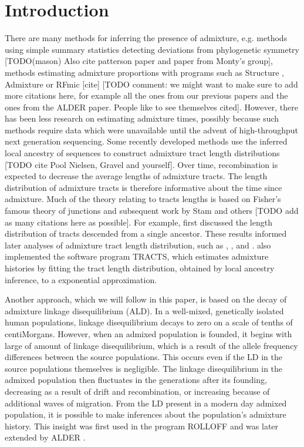 \section*{Introduction}
There are many methods for inferring the presence of admixture, e.g. methods
using simple summary statistics detecting deviations from phylogenetic symmetry
\cite{reich2009reconstructing} [TODO(mason) Also cite patterson paper and paper
from Monty's group], methods estimating admixture proportions with programs such
as Structure \cite{pritchard2000inference}, Admixture \cite{alexander2009fast}
or RFmic [cite] [TODO comment: we might want to make sure to add more citations
here, for example all the ones from our previous papers and the ones from the
ALDER paper. People like to see themselves cited]. However, there has been less
research on estimating admixture times, possibly because such methods require
data which were unavailable until the advent of high-throughput next generation
sequencing. Some recently developed methods use the inferred local ancestry of
sequences to construct admixture tract length distributions [TODO cite Pool Nielsen,
Gravel and yourself]. Over time, recombination is expected to decrease the
average lengths of admixture tracts. The length distribution of admixture tracts
is therefore informative about the time since admixture.  Much of the theory
relating to tracts lengths is based on Fisher's famous theory of junctions
\cite{fisher1949theory} and subsequent work by Stam \cite{stam1980distribution}
and others [TODO add as many citations here as possible]. For example,
\cite{baird2003distribution} first discussed the length distribution of tracts
descended from a single ancestor. These results informed later analyses of
admixture tract length distribution, such as \cite{pool2009inference},
\cite{gravel2012population}, and \cite{liang2014lengths}.
\cite{gravel2012population} also implemented the software program TRACTS, which
estimates admixture histories by fitting the tract length distribution, obtained
by local ancestry inference, to a exponential approximation.

Another approach, which we will follow in this paper, is based on the decay of
admixture linkage disequilibrium (ALD). In a well-mixed, genetically isolated
human populations, linkage disequilibrium decays to zero on a scale of tenths of
centiMorgans. However, when an admixed population is founded, it begins with
large of amount of linkage disequilibrium, which is a result of the allele
frequency differences between the source populations. This occurs even if the LD
in the source populations themselves is negligible. The linkage disequilibrium
in the admixed population then fluctuates in the generations after its founding,
decreasing as a result of drift and recombination, or increasing because of
additional waves of migration. From the LD present in a modern day admixed
population, it is possible to make inferences about the population's admixture
history. This insight was first used in the program ROLLOFF
\cite{moorjani2011history} and was later extended by ALDER
\cite{loh2013inferring}.

